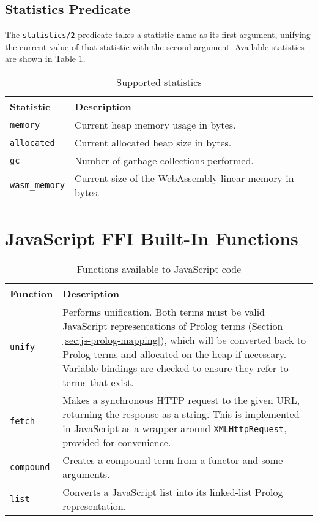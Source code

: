\begin{appendices}
\section{Statistics Predicate}

The \texttt{statistics/2} predicate takes a statistic name as its first argument, unifying the current value of that statistic with the second argument. Available statistics are shown in Table \ref{table:statistics}.

\begin{table}
\centering
\begin{tabular}{ll}
\hline
\textbf{Statistic} & \textbf{Description} \\
\hline
\texttt{memory} & Current heap memory usage in bytes. \\
\texttt{allocated} & Current allocated heap size in bytes. \\
\texttt{gc} & Number of garbage collections performed. \\
\texttt{wasm\_memory} & Current size of the WebAssembly linear memory in bytes. \\
\hline
\end{tabular}
\caption{Supported statistics}
\label{table:statistics}
\end{table}

\chapter{JavaScript FFI Built-In Functions}

\label{appendix:js-ffi}

\begin{table}[H]
\centering
\begin{tabular}{lp{12cm}}
\hline
\textbf{Function} & \textbf{Description} \\
\hline
\texttt{unify} & Performs unification. Both terms must be valid JavaScript representations of Prolog terms (Section \ref{sec:js-prolog-mapping}), which will be converted back to Prolog terms and allocated on the heap if necessary. Variable bindings are checked to ensure they refer to terms that exist. \\
\texttt{fetch} & Makes a synchronous HTTP request to the given URL, returning the response as a string. This is implemented in JavaScript as a wrapper around \texttt{XMLHttpRequest}, provided for convenience. \\
\texttt{compound} & Creates a compound term from a functor and some arguments. \\
\texttt{list} & Converts a JavaScript list into its linked-list Prolog representation. \\
\hline
\end{tabular}
\caption{Functions available to JavaScript code}
\label{tab:js-ffi}
\end{table}


\end{appendices}
